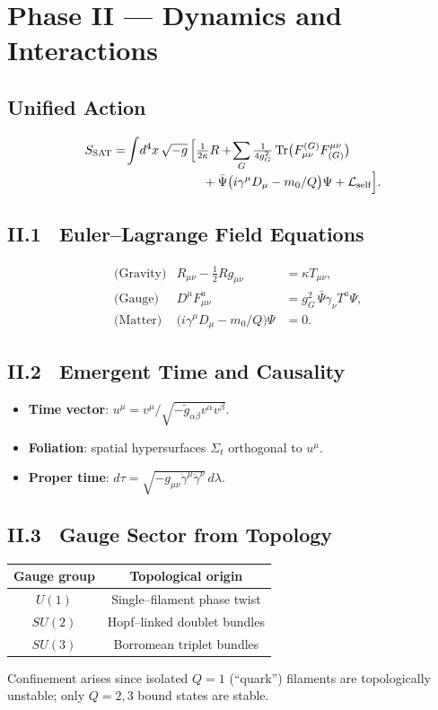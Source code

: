 \documentclass[11pt]{article}
\begin{document}
\section{Phase II --- Dynamics and Interactions}

\subsection{Unified Action}
\begin{align}
  S_{\text{SAT}}=\!\int\! d^4x\,\sqrt{-g}\,&\Bigl[
     \tfrac1{2\kappa}R
     +\!\sum_{G}\tfrac1{4g_G^2}\operatorname{Tr}\bigl(F^{(G)}_{\mu\nu}F^{\mu\nu}_{(G)}\bigr)
\\[-3pt]&\quad
     +\bar\Psi\bigl(i\gamma^\mu D_\mu - m_0/Q\bigr)\Psi
     +\mathcal L_{\text{self}}
  \Bigr].
\end{align}

\subsection{II.1~ Euler--Lagrange Field Equations}
\begin{align}
  &\text{(Gravity)}& R_{\mu\nu}-\tfrac12 R g_{\mu\nu}&=\kappa T_{\mu\nu},\\
  &\text{(Gauge)}  & D^\mu F^a_{\mu\nu}&=g_G^2\,\bar\Psi\gamma_\nu T^a\Psi,\\
  &\text{(Matter)} & \bigl(i\gamma^\mu D_\mu - m_0/Q\bigr)\Psi&=0.
\end{align}

\subsection{II.2~ Emergent Time and Causality}
\begin{itemize}
  \item \textbf{Time vector}: $u^\mu = v^\mu/\sqrt{-\tilde g_{\alpha\beta}v^\alpha v^\beta}$.
  \item \textbf{Foliation}: spatial hypersurfaces $\Sigma_t$ orthogonal to $u^\mu$.
  \item \textbf{Proper time}: $\displaystyle d\tau=\sqrt{-g_{\mu\nu}\dot\gamma^\mu\dot\gamma^\nu}\,d\lambda$.
\end{itemize}

\subsection{II.3~ Gauge Sector from Topology}
\begin{center}
\begin{tabular}{|c|c|}
\hline
Gauge group & Topological origin \\\hline
$U(1)$  & Single--filament phase twist \\
$SU(2)$ & Hopf--linked doublet bundles \\
$SU(3)$ & Borromean triplet bundles \\\hline
\end{tabular}
\end{center}
Confinement arises since isolated $Q=1$ (``quark'') filaments are topologically unstable; only $Q=2,3$ bound states are stable.
\end{document}
